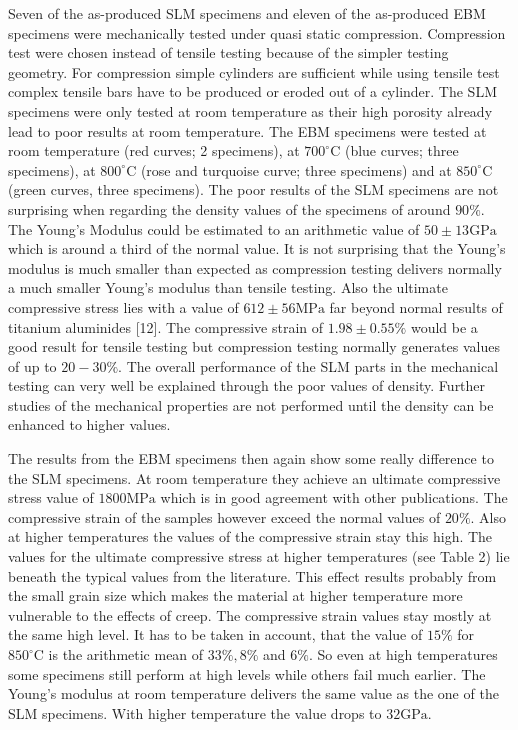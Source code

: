\documentclass[10pt]{article}
\begin{document}
Seven of the as-produced SLM specimens and eleven of the as-produced EBM specimens were mechanically tested under quasi static compression. Compression test were chosen instead of tensile testing because of the simpler testing geometry. For compression simple cylinders are sufficient while using tensile test complex tensile bars have to be produced or eroded out of a cylinder. The SLM specimens were only tested at room temperature as their high porosity already lead to poor results at room temperature. The EBM specimens were tested at room temperature (red curves; 2 specimens), at $700^{\circ} \mathrm{C}$ (blue curves; three specimens), at $800^{\circ} \mathrm{C}$ (rose and turquoise curve; three specimens) and at $850^{\circ} \mathrm{C}$ (green curves, three specimens). The poor results of the SLM specimens are not surprising when regarding the density values of the specimens of around $90 \%$. The Young's Modulus could be estimated to an arithmetic value of $50 \pm 13 \mathrm{GPa}$ which is around a third of the normal value. It is not surprising that the Young's modulus is much smaller than expected as compression testing delivers normally a much smaller Young's modulus than tensile testing. Also the ultimate compressive stress lies with a value of $612 \pm 56 \mathrm{MPa}$ far beyond normal results of titanium aluminides [12]. The compressive strain of $1.98 \pm 0.55 \%$ would be a good result for tensile testing but compression testing normally generates values of up to $20-30 \%$. The overall performance of the SLM parts in the mechanical testing can very well be explained through the poor values of density. Further studies of the mechanical properties are not performed until the density can be enhanced to higher values.

The results from the EBM specimens then again show some really difference to the SLM specimens. At room temperature they achieve an ultimate compressive stress value of $1800 \mathrm{MPa}$ which is in good agreement with other publications. The compressive strain of the samples however exceed the normal values of $20 \%$. Also at higher temperatures the values of the compressive strain stay this high. The values for the ultimate compressive stress at higher temperatures (see Table 2) lie beneath the typical values from the literature. This effect results probably from the small grain size which makes the material at higher temperature more vulnerable to the effects of creep. The compressive strain values stay mostly at the same high level. It has to be taken in account, that the value of $15 \%$ for $850^{\circ} \mathrm{C}$ is the arithmetic mean of $33 \%, 8 \%$ and $6 \%$. So even at high temperatures some specimens still perform at high levels while others fail much earlier. The Young's modulus at room temperature delivers the same value as the one of the SLM specimens. With higher temperature the value drops to $32 \mathrm{GPa}$.
\end{document}
